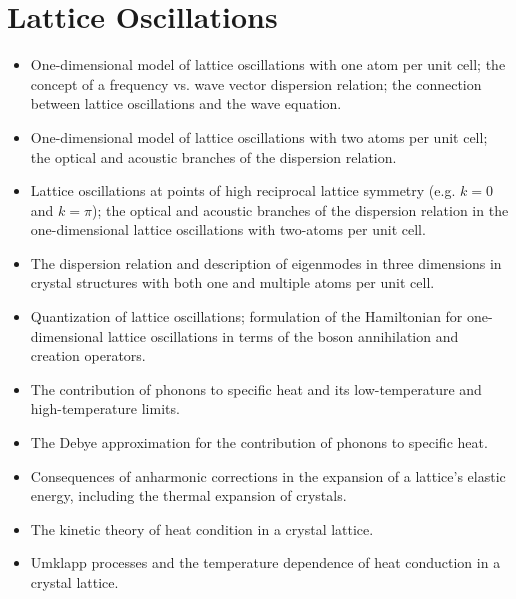 \section{Lattice Oscillations}
\begin{itemize}

    \item One-dimensional model of lattice oscillations with one atom per unit cell;
    the concept of a frequency vs. wave vector dispersion relation;
    the connection between lattice oscillations and the wave equation.

    \item One-dimensional model of lattice oscillations with two atoms per unit cell;
    the optical and acoustic branches of the dispersion relation.

    \item Lattice oscillations at points of high reciprocal lattice symmetry (e.g. $k=0$ and $k=\pi$);
    the optical and acoustic branches of the dispersion relation in the one-dimensional lattice oscillations with two-atoms per unit cell.

    \item The dispersion relation and description of eigenmodes in three dimensions in crystal structures with both one and multiple atoms per unit cell.

    \item Quantization of lattice oscillations;
    formulation of the Hamiltonian for one-dimensional lattice oscillations in terms of the boson annihilation and creation operators.

    \item The contribution of phonons to specific heat and its low-temperature and high-temperature limits.

    \item The Debye approximation for the contribution of phonons to specific heat.

    \item Consequences of anharmonic corrections in the expansion of a lattice's elastic energy, including the thermal expansion of crystals.

    \item The kinetic theory of heat condition in a crystal lattice.

    \item Umklapp processes and the temperature dependence of heat conduction in a crystal lattice.

\end{itemize}
    


